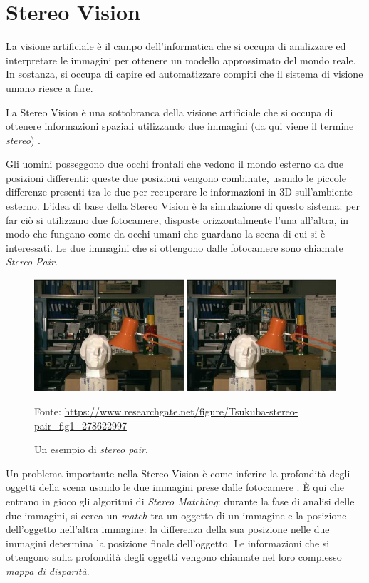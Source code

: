 \documentclass[12pt,a4paper,openright,twoside]{report}
\newcommand{\source}[1]{\caption*{\hfill \scriptsize Fonte: {#1}} }
\begin{document}
\chapter{Stereo Vision}

La visione artificiale è il campo dell'informatica che si occupa di analizzare ed interpretare le immagini per ottenere un modello approssimato del mondo reale. In sostanza, si occupa di capire ed automatizzare compiti che il sistema di visione umano riesce a fare.

La Stereo Vision è una sottobranca della visione artificiale che si occupa di ottenere informazioni spaziali utilizzando due immagini (da qui viene il termine \textit{stereo}) \cite{stereovision}.

Gli uomini posseggono due occhi frontali che vedono il mondo esterno da due posizioni differenti: queste due posizioni vengono combinate, usando le piccole differenze presenti tra le due per recuperare le informazioni in 3D sull'ambiente esterno. L'idea di base della Stereo Vision è la simulazione di questo sistema: per far ciò si utilizzano due fotocamere, disposte orizzontalmente l'una all'altra, in modo che fungano come da occhi umani che guardano la scena di cui si è interessati. Le due immagini che si ottengono dalle fotocamere sono chiamate \textit{Stereo Pair}.

\begin{figure}[h]
    \centering
    \includegraphics[width=\textwidth]{tsukuba-stereo-pair.png}
    \source{\url{https://www.researchgate.net/figure/Tsukuba-stereo-pair_fig1_278622997}}
    \caption{Un esempio di \textit{stereo pair}.}
    \label{img:stereo_pair}
\end{figure}

Un problema importante nella Stereo Vision è come inferire la profondità degli oggetti della scena usando le due immagini prese dalle fotocamere \cite{imagevideohandbook}. È qui che entrano in gioco gli algoritmi di \textit{Stereo Matching}: durante la fase di analisi delle due immagini, si cerca un \textit{match} tra un oggetto di un immagine e la posizione dell'oggetto nell'altra immagine: la differenza della sua posizione nelle due immagini determina la posizione finale dell'oggetto. Le informazioni che si ottengono sulla profondità degli oggetti vengono chiamate nel loro complesso \textit{mappa di disparità}.
\end{document}
